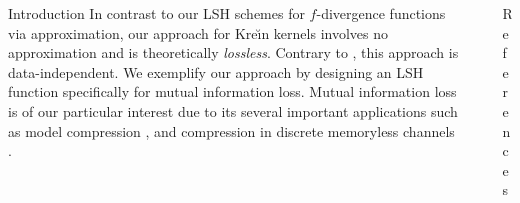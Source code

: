 \documentclass{beamer}
\newcommand{\kr}{Kre\u{\i}n\xspace}
\begin{document}
\begin{frame}
\begin{columns}
\begin{column}{.32\textwidth}
\begin{block}{Introduction}
			In contrast to our LSH schemes for $ f $-divergence functions via 
			approximation, our approach for \kr kernels involves no 
			approximation and is theoretically \emph{lossless}.
			Contrary to \citep{mu2010non}, this approach is data-independent.
			We exemplify our approach by designing an LSH function specifically 
			for mutual information loss. Mutual information loss is of our 
			particular interest due to its several important applications such 
			as model compression 
			\cite{bateni2019categorical,dhillon2003divisive}, and compression 
			in discrete memoryless channels 
			\cite{
				kartowsky2018greedy,sakai2014suboptimal,
				zhang2016low}.
		\end{block}
	\end{column}
	\begin{column}{.32\textwidth}
		
	\end{column}
	\begin{column}{.32\textwidth}
		\begin{block}{References}
\mbox{}\vspace{-\baselineskip}
				\printbibliography

		\end{block}
	\end{column}
\end{columns}
\end{frame}
\end{document}
